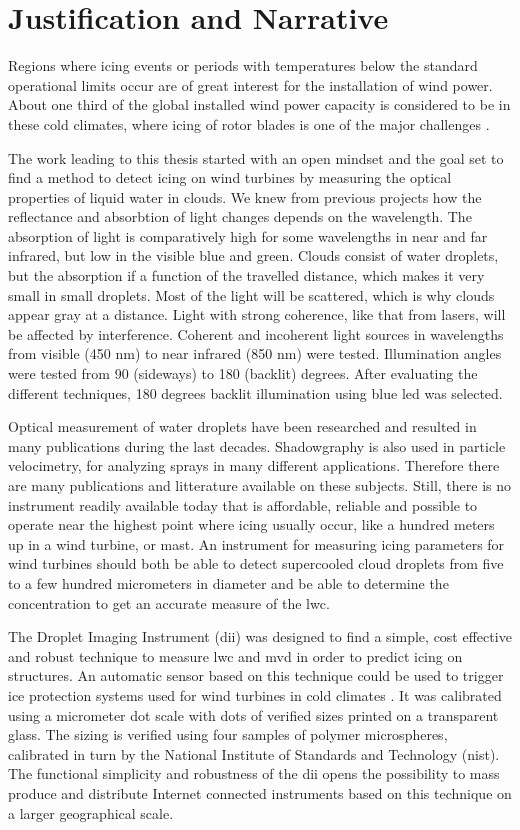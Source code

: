 \section{Justification and Narrative}

Regions where icing events or periods with temperatures below the standard operational limits occur are of great interest for the installation of wind power. About one third of the global installed wind power capacity is considered to be in these cold climates, where icing of rotor blades is one of the major challenges \cite{iea2017}.

The work leading to this thesis started with an open mindset and the goal set to find a method to detect icing on wind turbines by measuring the optical properties of liquid water in clouds. We knew from previous projects how the reflectance and absorbtion of light changes depends on the wavelength. The absorption of light is comparatively high for some wavelengths in near and far infrared, but low in the visible blue and green. Clouds consist of water droplets, but the absorption if a function of the travelled distance, which makes it very small in small droplets. Most of the light will be scattered, which is why clouds appear gray at a distance. Light with strong coherence, like that from lasers, will be affected by interference. Coherent and incoherent light sources in wavelengths from visible (450 nm) to near infrared (850 nm) were tested. Illumination angles were tested from 90 (sideways) to 180 (backlit) degrees. After evaluating the different techniques, 180 degrees backlit illumination using blue \gls{led} was selected.

Optical measurement of water droplets have been researched and resulted in many publications during the last decades. Shadowgraphy is also used in particle velocimetry, for analyzing sprays in many different applications. Therefore there are many publications and litterature available on these subjects. Still, there is no instrument readily available today that is affordable, reliable and possible to operate near the highest point where icing usually occur, like a hundred meters up in a wind turbine, or mast. An instrument for measuring icing parameters for wind turbines should both be able to detect supercooled cloud droplets from five to a few hundred micrometers in diameter and be able to determine the concentration to get an accurate measure of the \gls{lwc}.

The Droplet Imaging Instrument (\gls{dii}) was designed to find a simple, cost effective and robust technique to measure \gls{lwc} and \gls{mvd} in order to predict icing on structures. An automatic sensor based on this technique could be used to trigger ice protection systems used for wind turbines in cold climates \cite{lamra2013}. It was calibrated using a micrometer dot scale with dots of verified sizes printed on a transparent glass. The sizing is verified using four samples of polymer microspheres, calibrated in turn by the National Institute of Standards and Technology (\gls{nist}). The functional simplicity and robustness of the \gls{dii} opens the possibility to mass produce and distribute Internet connected instruments based on this technique on a larger geographical scale.

